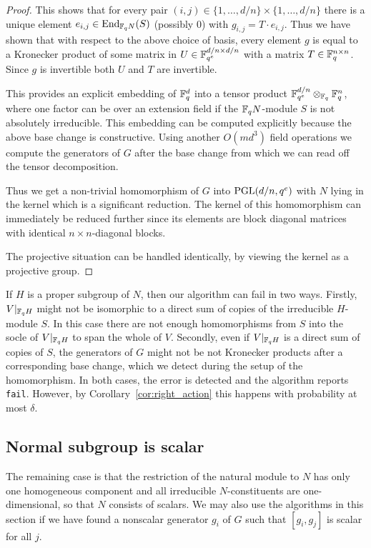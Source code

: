 \begin{proof}
This shows that for every pair $(i,j) \in \{ 1, \ldots, d/n \} \times 
\{ 1, \ldots, d/n \}$ there
is a unique element $e_{i,j} \in \End_{\F_q N}(S)$ (possibly $0$) with 
$g_{i,j} = T \cdot e_{i,j}$. Thus we have shown that with respect to
the above choice of basis, every element $g$ is equal to a Kronecker 
product of some matrix in $U \in \mathbb{F}_{q^e}^{d/n \times d/n}$ with a matrix
$T \in \mathbb{F}_q^{n \times n}$. Since $g$ is invertible both 
$U$ and $T$ are invertible. 

This provides an explicit embedding of 
$\mathbb{F}_q^d$ into a tensor product $\mathbb{F}_{q^e}^{d/n} \otimes_{\mathbb{F}_q} \mathbb{F}_q^n$, 
where one factor can be over an extension field if the $\mathbb{F}_q N$-module
$S$ is not absolutely irreducible. This embedding can be computed
explicitly because the above base change is constructive.
Using another $O(md^3)$ field operations we compute the generators
of $G$ after the base change from which we can read off the tensor
decomposition.

Thus we get a non-trivial homomorphism of $G$ into $\PGL(d/n,q^e)$ with
$N$ lying in the kernel which is a significant reduction. The kernel of
this homomorphism can immediately be reduced further since its 
elements are block
diagonal matrices with identical $n \times n$-diagonal blocks.

The projective situation can be handled identically,
by viewing the kernel as a  projective group.
\end{proof}

If  $H$ is a proper subgroup of $N$, then
our algorithm can fail in two ways. Firstly,
$V|_{\mathbb{F}_q H}$ might not be isomorphic to a direct sum of
copies of the irreducible $H$-module $S$. In this case
there are not enough homomorphisms from $S$ into
the socle of $V|_{\mathbb{F}_q H}$ to span the whole of $V$. Secondly,
even if $V|_{\mathbb{F}_q H}$ is a direct sum of copies of $S$,  the
generators of $G$ might not be not Kronecker products after a corresponding
base change, which we detect during the setup of the homomorphism. In
both cases, the error is detected and the algorithm reports {\tt fail}. However,
by Corollary~\ref{cor:right_action} this happens with probability at most $\delta$.

\subsection{Normal subgroup is scalar} \label{subsec:scalars}

The remaining case is that the restriction of the natural module to $N$
has only one homogeneous component and all irreducible $N$-constituents
are one-dimensional, so that $N$ consists of scalars.  
We may also use the algorithms in this section if we have found a 
nonscalar generator $g_i$ of $G$ such that $[g_i, g_j]$ is scalar for all $j$. 




